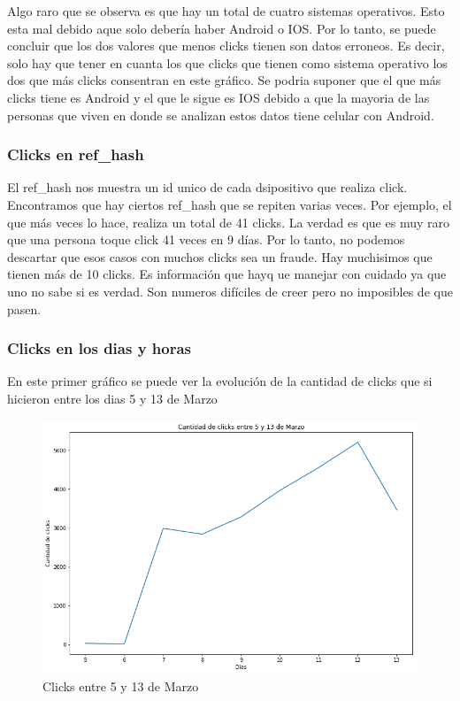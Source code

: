 \documentclass[a4paper, 12pt]{article}
\newcommand\tab[1][1cm]{\hspace*{#1}}
\begin{document}
		\tab Algo raro que se observa es que hay un total de cuatro sistemas operativos. Esto esta mal debido aque solo debería haber Android o IOS. Por lo tanto, se puede concluir que los dos valores que menos clicks tienen son datos erroneos. Es decir, solo hay que tener en cuanta los que clicks que tienen como sistema operativo los dos que más clicks consentran en este gráfico. Se podria suponer que el que más clicks tiene es Android y el que le sigue es IOS debido a que la mayoria de las personas que viven en donde se analizan estos datos tiene celular con Android.

	\subsubsection{Clicks en ref_hash}
		\tab El ref_hash nos muestra un id unico de cada dsipositivo que realiza click. Encontramos que hay ciertos ref_hash que se repiten varias veces. Por ejemplo, el que más veces lo hace, realiza un total de 41 clicks. La verdad es que es muy raro que una persona toque click 41 veces en 9 días. Por lo tanto, no podemos descartar que esos casos con muchos clicks sea un fraude. Hay muchisimos que tienen más de 10 clicks. Es información que hayq ue manejar con cuidado ya que uno no sabe si es verdad. Son numeros difíciles de creer pero no imposibles de que pasen.


	\subsubsection{Clicks en los dias y horas}
		En este primer gráfico se puede ver la evolución de la cantidad de clicks que si hicieron entre los dias 5 y 13 de Marzo

		\FloatBarrier
		\begin{figure}[h]
			\centering
			\includegraphics[width=\textwidth]{images/clicks/clicks_days.png}
			\caption{Clicks entre 5 y 13 de Marzo}
		\end{figure}
		\FloatBarrier
\end{document}
